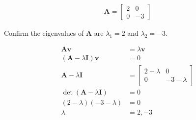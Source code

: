 \begin{align*}
    \boldsymbol{A} = \begin{bmatrix}
        2 & 0 \\
        0 & -3
    \end{bmatrix}
\end{align*}

Confirm the eigenvalues of $\boldsymbol{A}$ are $\lambda_1 = 2$ and $\lambda_2 = -3$.

\begin{solution}
    \begin{align*}
        \boldsymbol{Av} &= \lambda \boldsymbol{v} \\
        \left(\boldsymbol{A} - \lambda\boldsymbol{I}\right)\boldsymbol{v} &= 0 \\
        \boldsymbol{A} - \lambda\boldsymbol{I} &= \begin{bmatrix}
            2 - \lambda & 0 \\
            0 & -3 - \lambda
        \end{bmatrix} \\
        \det\left(\boldsymbol{A} - \lambda\boldsymbol{I}\right) &= 0 \\
        \left(2 - \lambda\right) \left(-3 - \lambda\right) &= 0 \\
        \lambda &= 2, -3
    \end{align*}
\end{solution}